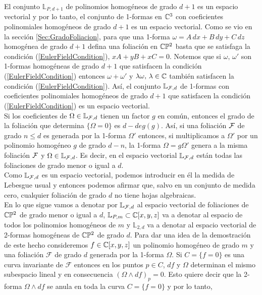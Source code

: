 El conjunto $\mathbb{L}_{P,d+1}$ de polinomios homogéneos de grado $d+1$ es un espacio vectorial y por lo tanto, el conjunto de 1-formas en $\mathbb{C}^{3}$ con coeficientes polinomiales homogéneos de grado $d+1$ es un espacio vectorial. Como se vio en la sección \ref{Sec:GradoFoliacion}, para que una 1-forma $\omega=A\, dx+B\, dy+C\, dz$ homogénea de grado $d+1$ defina una foliación en $\mathbb{C}\mathbb{P}^2$ basta que se satisfaga la condición (\ref{EulerFieldCondition}), $xA+yB+xC=0$. Notemos que si $\omega, \, \omega'$ son 1-formas homogéneas de grado $d+1$ que satisfacen la condición (\ref{EulerFieldCondition}) entonces $\omega + \omega'$ y $\lambda\omega,\, \lambda\in\mathbb{C}$ también satisfacen la condición (\ref{EulerFieldCondition}). Así, el conjunto $\mathbb{L}_{\mathcal{F},d}$ de 1-formas  con coeficientes polinomiales homogéneos  de grado $d+1$ que satisfacen la condición (\ref{EulerFieldCondition}) es un espacio vectorial.\\

Si los coeficientes de $\Omega\in\mathbb{L}_{\mathcal{F},d}$ tienen un factor $g$ en común, entonces el grado de la foliación que determina $\{\Omega =0\}$ es $d-deg(g)$. Así, si una foliación $\mathcal{F}$ de grado $n\leq d$ es generada por la 1-forma $\Omega'$ entonces, si multiplicamos a $\Omega'$ por un polinomio homogéneo $g$ de grado $d-n$, la 1-forma $\Omega=g\Omega'$ genera a la misma foliación $\mathcal{F}$ y $\Omega\in\mathbb{L}_{\mathcal{F},d}$. Es decir, en el espacio vectorial $\mathbb{L}_{\mathcal{F},d}$ están todas las foliaciones de grado menor o igual a $d$.\\

Como $\mathbb{L}_{\mathcal{F},d}$ es un espacio vectorial, podemos introducir en él la medida de Lebesgue usual y entonces podemos afirmar que, salvo en un conjunto de medida cero, cualquier foliación de grado $d$ no tiene hojas algebraicas.\\

En lo que sigue vamos a denotar por $\mathbb{L}_{\mathcal{F},d}$ al espacio vectorial de foliaciones de $\mathbb{C}\mathbb{P}^2$ de grado menor o igual a $d$, $\mathbb{L}_{P,m}\subset\mathbb{C}[x,y,z]$ va a denotar al espacio de todos los polinomios homogéneos de $m$ y $\mathbb{L}_{2,d}$ va a denotar al espacio vectorial de 2-formas homogéneas de $\mathbb{C}\mathbb{P}^2$ de grado $d$. Para dar una idea de la demostración de este hecho consideremos $f\in\mathbb{C}[x,y,z]$ un polinomio homogéneo  de grado $m$  y una foliación $\mathcal{F}$ de grado $d$ generada por la 1-forma $\Omega$. Si $C=\{f=0\}$ es una curva invariante de $\mathcal{F}$ entonces en los puntos $p\in C$, $df$ y $\Omega$ determinan el mismo subespacio lineal y en consecuencia $(\Omega\wedge df)_{p}=0$. Esto quiere decir que la 2-forma $\Omega\wedge df$ se anula en toda la curva $C=\{f=0\}$ y por lo tanto,

